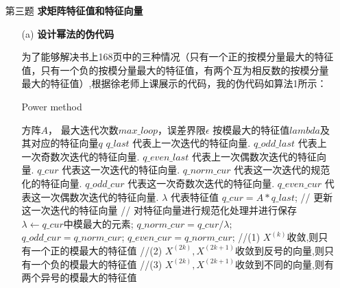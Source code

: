 \documentclass[12pt,a4paper,utf8]{ctexart}
\begin{document}
\begin{enumerate}
\item[第三题] \textbf{求矩阵特征值和特征向量}
    \begin{itemize}
    \item[(a)] \textbf{设计幂法的伪代码}
    \par 为了能够解决书上168页中的三种情况（只有一个正的按模分量最大的特征值，只有一个负的按模分量最大的特征值，有两个互为相反数的按模分量最大的特征值）,根据徐老师上课展示的代码，我的伪代码如算法1所示：
    \begin{algorithm}  
        \caption{Power method}  
        \begin{algorithmic}[1] %
            \Require 方阵$A$， 最大迭代次数$max\_loop$，误差界限$\epsilon$
            \Ensure 按模最大的特征值$lambda$及其对应的特征向量$q$
                \State $q\_last$ 代表上一次迭代的特征向量.
                \State $q\_odd\_last$ 代表上一次奇数次迭代的特征向量.
                \State $q\_even\_last$ 代表上一次偶数次迭代的特征向量.
                \State $q\_cur$ 代表这一次迭代的特征向量.
                \State $q\_norm\_cur$ 代表这一次迭代的规范化的特征向量.
                \State $q\_odd\_cur$ 代表这一次奇数次迭代的特征向量.
                \State $q\_even\_cur$ 代表这一次偶数次迭代的特征向量.
                \State $\lambda$ 代表特征值
                    \State $q\_cur = A*q\_last$; // 更新这一次迭代的特征向量
                    \State // 对特征向量进行规范化处理并进行保存
                    \State $\lambda \gets q\_cur$中模最大的元素;
                    \State $q\_norm\_cur = q\_cur / \lambda $;
                        $q\_odd\_cur = q\_norm\_cur$;
                    \Else{}
                        $q\_even\_cur = q\_norm\_cur$;
                    \EndIf
                    \State //(1) $X^{(k)}$收敛,则只有一个正的模最大的特征值
                    \EndIf
                    \State //(2) $X^{(2k)},X^{(2k+1)}$收敛到反号的向量,则只有一个负的模最大的特征值
                    \EndIf
                    \State //(3) $X^{(2k)},X^{(2k+1)}$收敛到不同的向量,则有两个异号的模最大的特征值

\end{algorithmic}
\end{algorithm}
\end{itemize}
\end{enumerate}
\end{document}
